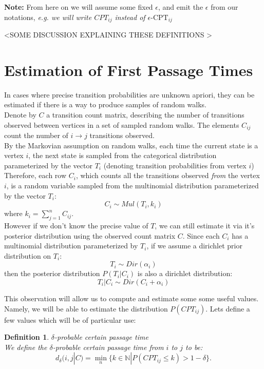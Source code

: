 \documentclass{article}
\newtheorem{definition}{Definition}
\begin{document}
\textbf{Note:} From here on we will assume some fixed $\epsilon$, and emit the $\epsilon$ from our notations, \textit{e.g. we will write $CPT_{ij}$ instead of $\epsilon\text{-CPT}_{ij} $}
    
<SOME DISCUSSION EXPLAINING THESE DEFINITIONS >

\section{Estimation of First Passage Times}

In cases where precise transition probabilities are unknown apriori, they can be estimated if there is a way to produce samples of random walks.\\
Denote by $C$ a transition count matrix, describing the number of transitions observed between vertices in a set of sampled random walks. The elements $C_{ij}$ count the number of $i \rightarrow j$ transitions observed.\\

By the Markovian assumption on random walks, each time the current state is a vertex $i$, the next state is sampled from the categorical distribution parameterized by the vector $T_i$ (denoting transition probabilities from vertex $i$) 
Therefore, each row $C_i$, which counts all the transitions observed \textit{from} the vertex $i$, is a random variable sampled from the multinomial distribution parameterized by the vector $T_i$:
\begin{equation}
    C_i \sim Mul(T_i, k_i) 
\end{equation}
where $k_i = \sum_{j=1}^n C_{ij}$. \\

However if we don't know the precise value of $T$, we can still estimate it via it's posterior distribution using the observed count matrix $C$.
Since each $C_i$ has a multinomial distribution parameterized by $T_i$, if we assume a dirichlet prior distribution on $T_i$:
\begin{equation}
    T_i \sim Dir(\alpha_i)
\end{equation}
then the posterior distribution $P(T_i|C_i)$ is also a dirichlet distribution:
\begin{equation}\label{post_T_i}
    T_i|C_i \sim Dir(C_i + \alpha_i) 
\end{equation}

This observation will allow us to compute and estimate some some useful values. Namely, we will be able to estimate the distribution $P(CPT_{ij})$. Lets define a few values which will be of particular use:
\begin{definition}
    $\delta$-probable certain passage time \\
    We define the $\delta$-probable certain passage time from $i$ to $j$ to be:
    \[
        d_{\delta}(i,j|C) = \min_n \{ k \in \mathbb{N} |P(CPT_{ij} \leq k) > 1-\delta  \}
    .\] 
\end{definition}
\end{document}
